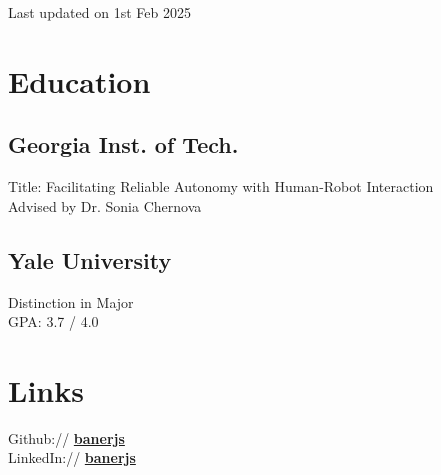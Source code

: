 \documentclass[]{deedy-resume}
\begin{document}
%
%
{\par\hfill{\scriptsize\color{gray}Last updated on 1st Feb 2025}}

%
%

%
%

\begin{minipage}[t]{0.33\textwidth}


\section{Education}

\subsection{Georgia Inst. of Tech.}
Title: Facilitating Reliable Autonomy with Human-Robot Interaction \\
Advised by Dr. Sonia Chernova
\sectionsep

\subsection{Yale University}
Distinction in Major \\
GPA: 3.7 / 4.0


\section{Links}
Github:// \href{https://github.com/banerjs}{\bf banerjs} \\
LinkedIn://  \href{https://www.linkedin.com/in/banerjs}{\bf banerjs} \\


\end{minipage}
\end{document}
